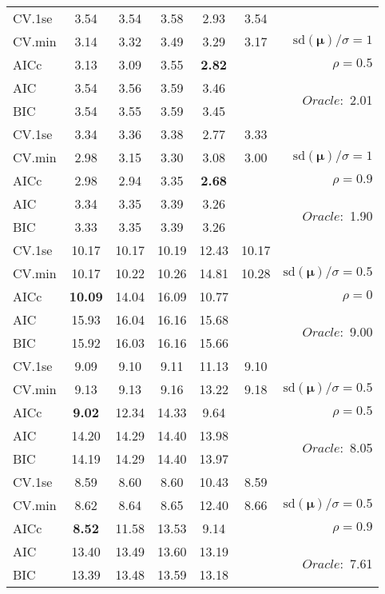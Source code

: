 \begin{table}
\begin{center}
\begin{tabular}{l*{5}{c}|r}
CV.1se & 3.54 & 3.54 & 3.58 & 2.93 & 3.54 & \\
CV.min & 3.14 & 3.32 & 3.49 & 3.29 & 3.17 &  $\mathrm{sd}(\mathbf{\mu})/\sigma=1$ \\
AICc & 3.13 & 3.09 & 3.55 & {\bf 2.82} & & $\rho=0.5$ \\
AIC & 3.54 & 3.56 & 3.59 & 3.46 & &  \multirow{2}{*}{$Oracle: $ 2.01} \\
BIC & 3.54 & 3.55 & 3.59 & 3.45 & &  \\
 \hline 
CV.1se & 3.34 & 3.36 & 3.38 & 2.77 & 3.33 & \\
CV.min & 2.98 & 3.15 & 3.30 & 3.08 & 3.00 &  $\mathrm{sd}(\mathbf{\mu})/\sigma=1$ \\
AICc & 2.98 & 2.94 & 3.35 & {\bf 2.68} & & $\rho=0.9$ \\
AIC & 3.34 & 3.35 & 3.39 & 3.26 & &  \multirow{2}{*}{$Oracle: $ 1.90} \\
BIC & 3.33 & 3.35 & 3.39 & 3.26 & &  \\
 \hline 
CV.1se & 10.17 & 10.17 & 10.19 & 12.43 & 10.17 & \\
CV.min & 10.17 & 10.22 & 10.26 & 14.81 & 10.28 &  $\mathrm{sd}(\mathbf{\mu})/\sigma=0.5$ \\
AICc & {\bf 10.09} & 14.04 & 16.09 & 10.77 & & $\rho=0$ \\
AIC & 15.93 & 16.04 & 16.16 & 15.68 & &  \multirow{2}{*}{$Oracle: $ 9.00} \\
BIC & 15.92 & 16.03 & 16.16 & 15.66 & &  \\
 \hline 
CV.1se & 9.09 & 9.10 & 9.11 & 11.13 & 9.10 & \\
CV.min & 9.13 & 9.13 & 9.16 & 13.22 & 9.18 &  $\mathrm{sd}(\mathbf{\mu})/\sigma=0.5$ \\
AICc & {\bf 9.02} & 12.34 & 14.33 & 9.64 & & $\rho=0.5$ \\
AIC & 14.20 & 14.29 & 14.40 & 13.98 & &  \multirow{2}{*}{$Oracle: $ 8.05} \\
BIC & 14.19 & 14.29 & 14.40 & 13.97 & &  \\
 \hline 
CV.1se & 8.59 & 8.60 & 8.60 & 10.43 & 8.59 & \\
CV.min & 8.62 & 8.64 & 8.65 & 12.40 & 8.66 &  $\mathrm{sd}(\mathbf{\mu})/\sigma=0.5$ \\
AICc & {\bf 8.52} & 11.58 & 13.53 & 9.14 & & $\rho=0.9$ \\
AIC & 13.40 & 13.49 & 13.60 & 13.19 & &  \multirow{2}{*}{$Oracle: $ 7.61} \\
BIC & 13.39 & 13.48 & 13.59 & 13.18 & &  \\
 \hline 
\end{tabular}
\end{center}
\vspace{-1cm}
\end{table}





